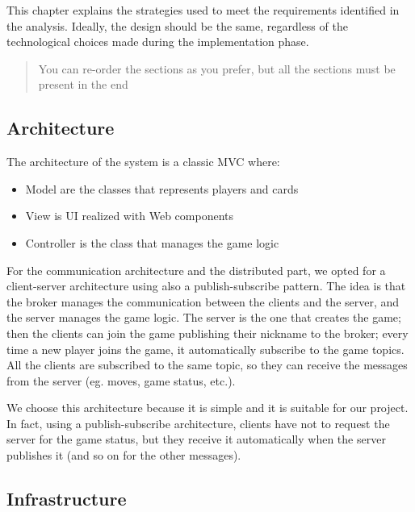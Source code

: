 \documentclass{scrartcl}
\begin{document}
This chapter explains the strategies used to meet the requirements
identified in the analysis. Ideally, the design should be the same,
regardless of the technological choices made during the implementation
phase.

\begin{quote}
You can re-order the sections as you prefer, but all the sections must
be present in the end
\end{quote}

\subsection{Architecture}\label{architecture}

  The architecture of the system is a classic MVC where:
  \begin{itemize}
    \item Model are the classes that represents players and cards
    \item View is UI realized with Web components
    \item Controller is the class that manages the game logic
  \end{itemize}
  For the communication architecture and the distributed part, we opted for a client-server architecture using also a publish-subscribe pattern. \newline
  The idea is that the broker manages the communication between the clients and the server, and the server manages the game logic.\newline
  The server is the one that creates the game; then the clients can join the game publishing their nickname to the broker; every time a new player joins the game, it automatically subscribe to the game topics.\newline
  All the clients are subscribed to the same topic, so they can receive the messages from the server (eg. moves, game status, etc.).\newline

  We choose this architecture because it is simple and it is suitable for our project. In fact, using a publish-subscribe architecture, clients have not to request the server for the game status, but they receive it automatically when the server publishes it (and so on for the other messages).

\subsection{Infrastructure}\label{infrastructure}
\end{document}

